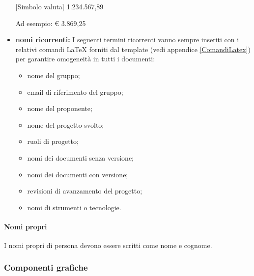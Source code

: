 \begin{itemize}
                    \centerline{[Simbolo valuta] 1.234.567,89}
                    Ad esempio: € 3.869,25
                    \item \textbf{nomi ricorrenti:}
                    I seguenti termini ricorrenti vanno sempre inseriti con i relativi comandi \LaTeX{} forniti dal template (vedi appendice \ref{ComandiLatex}) per garantire omogeneità in tutti i documenti: 
                    \begin{itemize}
                        \item nome del gruppo;
                        \item email di riferimento del gruppo;
                        \item nome del proponente;
                        \item nome del progetto svolto;
                        \item ruoli di progetto;
                        \item nomi dei documenti senza versione;
                        \item nomi dei documenti con versione;
                        \item revisioni di avanzamento del progetto;
                        \item nomi di strumenti o tecnologie.
                    \end{itemize}
                \end{itemize}
                \paragraph{Nomi propri}
                    I nomi propri di persona devono essere scritti come nome e cognome.
        \subsubsection{Componenti grafiche} \label{sec:normeGrafiche}
